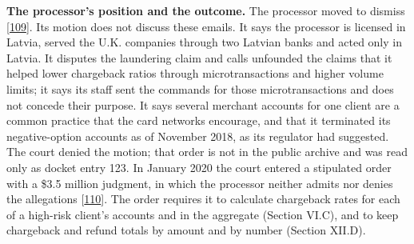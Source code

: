 \documentclass[
  11pt,
]{article}
\begin{document}
\textbf{The processor's position and the outcome.} The processor moved
to dismiss {[}\protect\hyperlink{ref-TransactPro2019Motion}{109}{]}. Its
motion does not discuss these emails. It says the processor is licensed
in Latvia, served the U.K. companies through two Latvian banks and acted
only in Latvia. It disputes the laundering claim and calls unfounded the
claims that it helped lower chargeback ratios through microtransactions
and higher volume limits; it says its staff sent the commands for those
microtransactions and does not concede their purpose. It says several
merchant accounts for one client are a common practice that the card
networks encourage, and that it terminated its negative-option accounts
as of November 2018, as its regulator had suggested. The court denied
the motion; that order is not in the public archive and was read only as
docket entry 123. In January 2020 the court entered a stipulated order
with a \$3.5 million judgment, in which the processor neither admits nor
denies the allegations
{[}\protect\hyperlink{ref-CDCal2020TransactProOrder}{110}{]}. The order
requires it to calculate chargeback rates for each of a high-risk
client's accounts and in the aggregate (Section VI.C), and to keep
chargeback and refund totals by amount and by number (Section XII.D).
\end{document}
